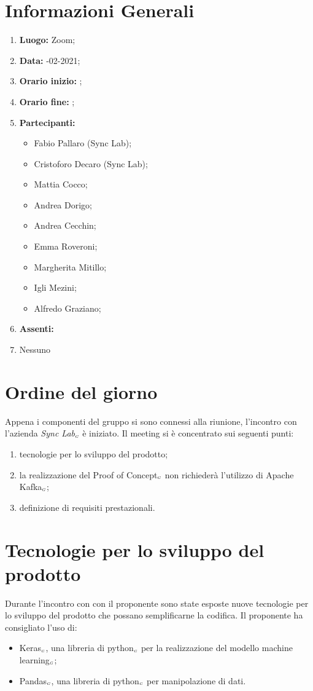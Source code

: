 \newpage
\section{Informazioni Generali}
\begin{enumerate}
	\item \textbf{Luogo:} \normalfont Zoom;
	\item \textbf{Data:} -02-2021;
	\item \textbf{Orario inizio:} ;
	\item \textbf{Orario fine:} ;
	\item \textbf{Partecipanti:}
	\begin{itemize}
		\item Fabio Pallaro (Sync Lab);
		\item Cristoforo Decaro (Sync Lab);
		\item Mattia Cocco;
		\item Andrea Dorigo;
		\item Andrea Cecchin;
		\item Emma Roveroni;
		\item Margherita Mitillo;
		\item Igli Mezini;
		\item Alfredo Graziano;
	\end{itemize}
	\item \textbf{Assenti:}
	\item Nessuno
\end{enumerate}
\section{Ordine del giorno}
Appena i componenti del gruppo si sono connessi alla riunione, l'incontro con l'azienda \textit{Sync Lab}$_{\scaleto{G}{3pt}}$ è iniziato.
Il meeting si è concentrato sui seguenti punti:
\begin{enumerate}
	\item tecnologie per lo sviluppo del prodotto;
	\item la realizzazione del Proof of Concept$_{\scaleto{G}{3pt}}$ non richiederà l'utilizzo di Apache Kafka$_{\scaleto{G}{3pt}}$;
	\item definizione di requisiti prestazionali.
\end{enumerate}
\section{Tecnologie per lo sviluppo del prodotto}
Durante l'incontro con con il proponente sono state esposte nuove tecnologie per lo sviluppo del prodotto che possano semplificarne la codifica. Il proponente ha consigliato l'uso di:
\begin{itemize}
	\item Keras$_{\scaleto{G}{3pt}}$, una libreria di python$_{\scaleto{G}{3pt}}$ per la realizzazione del modello machine learning$_{\scaleto{G}{3pt}}$;
	\item Pandas$_{\scaleto{G}{3pt}}$, una libreria di python$_{\scaleto{G}{3pt}}$ per manipolazione di dati.
\end{itemize}
